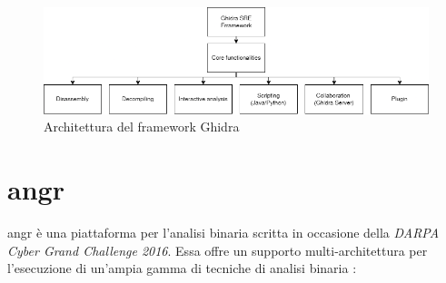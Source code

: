 \documentclass[../main.tex]{subfiles}
\begin{document}
\begin{figure}[H]
    \centering
    \includegraphics[width = \textwidth]{../images/ghidra.png}
    \caption{Architettura del framework Ghidra}
\end{figure}
\section{angr}
angr \cite{angr_introductory_paper} è una piattaforma per l'analisi binaria scritta in occasione della \textit{DARPA Cyber Grand Challenge 2016}.
Essa offre un supporto multi-architettura per l'esecuzione di un'ampia gamma di tecniche di analisi binaria \cite{angr_introductory_paper}:
\end{document}
